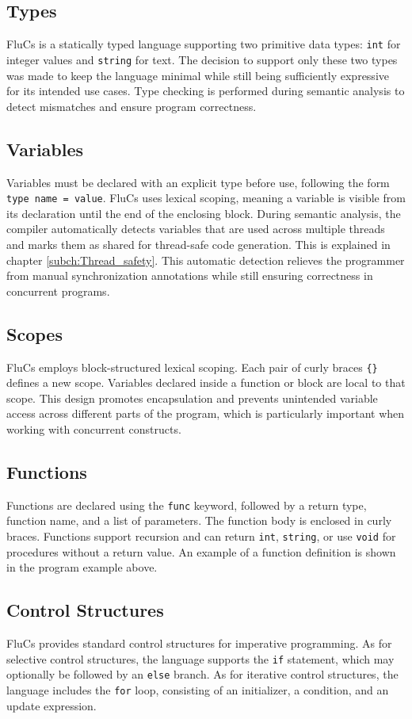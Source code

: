 \subsection{Types}
FluCs is a statically typed language supporting two primitive data types: \texttt{int} for integer values and \texttt{string} for text. The decision to support only these two types was made to keep the language minimal while still being sufficiently expressive for its intended use cases. Type checking is performed during semantic analysis to detect mismatches and ensure program correctness.
\subsection{Variables}
Variables must be declared with an explicit type before use, following the form \texttt{type name = value}. FluCs uses lexical scoping, meaning a variable is visible from its declaration until the end of the enclosing block. During semantic analysis, the compiler automatically detects variables that are used across multiple threads and marks them as shared for thread-safe code generation. This is explained in chapter \ref{subch:Thread_safety}. This automatic detection relieves the programmer from manual synchronization annotations while still ensuring correctness in concurrent programs.
\subsection{Scopes}
FluCs employs block-structured lexical scoping. Each pair of curly braces \texttt{\{\}} defines a new scope. Variables declared inside a function or block are local to that scope. This design promotes encapsulation and prevents unintended variable access across different parts of the program, which is particularly important when working with concurrent constructs.
\subsection{Functions}
Functions are declared using the \texttt{func} keyword, followed by a return type, function name, and a list of parameters. The function body is enclosed in curly braces. Functions support recursion and can return \texttt{int}, \texttt{string}, or use \texttt{void} for procedures without a return value. An example of a function definition is shown in the program example above.
\subsection{Control Structures}
FluCs provides standard control structures for imperative programming. As for selective control structures, the language supports the \texttt{if} statement, which may optionally be followed by an \texttt{else} branch. As for iterative control structures, the language includes the \texttt{for} loop, consisting of an initializer, a condition, and an update expression.
